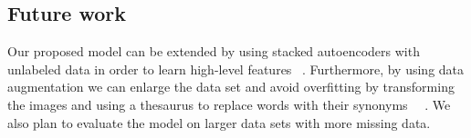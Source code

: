 \documentclass{article} %
\begin{document}
\subsection{Future work}
Our proposed model can be extended by using stacked autoencoders with unlabeled data in order to learn high-level features ~\cite{icml_unsupervised}. Furthermore, by using data augmentation we can enlarge the data set and avoid overfitting by transforming the images and using a thesaurus to replace words with their synonyms ~\cite{icml_unsupervised}~\cite{nips_text}. We also plan to evaluate the model on larger data sets with more missing data.

%
%
%
%
%
%
%
\printbibliography
\end{document}
